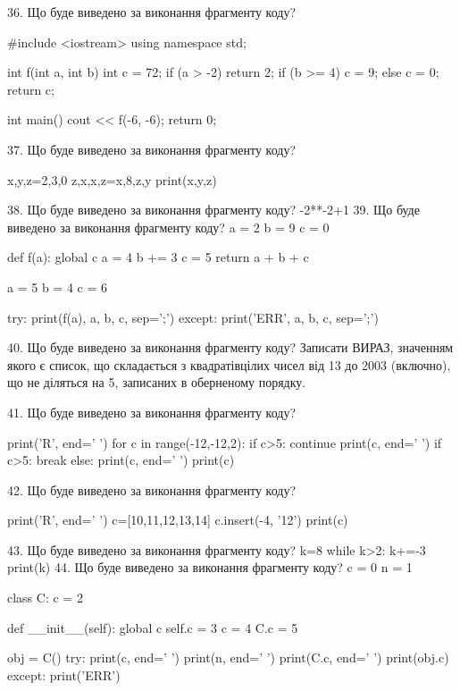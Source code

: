 \documentclass[11pt]{article}
\begin{document}
36. Що буде виведено за виконання фрагменту коду?

#include <iostream>
using namespace std;

int f(int a, int b){
    int c = 72;
    if (a > -2)
        return 2;
    if (b >= 4)
         c = 9;
    else 
        c = 0;
    return c;
}

int main(){
    cout << f(-6, -6);
    return 0;
}

37. Що буде виведено за виконання фрагменту коду?

x,y,z=2,3,0
z,x,x,z=x,8,z,y
print(x,y,z)

38. Що буде виведено за виконання фрагменту коду?
-2**-2+1
39. Що буде виведено за виконання фрагменту коду?
a = 2
b = 9
c = 0

def f(a):
global c    a = 4
    b += 3
    c = 5
    return a + b + c

a = 5
b = 4
c = 6

try:
    print(f(a), a, b, c, sep=';')
except:
    print('ERR', a, b, c, sep=';')

40. Що буде виведено за виконання фрагменту коду?
Записати ВИРАЗ, значенням якого є список, що складається з квадратівцілих чисел від 13 до 2003 (включно), що не діляться на 5, записаних в обернено\-му порядку.

41. Що буде виведено за виконання фрагменту коду?

print('R', end=' ')
for c in range(-12,-12,2):
    if c>5:
        continue
        print(c, end=' ')
    if c>5:
        break
    else:
        print(c, end=' ')
    print(c)

42. Що буде виведено за виконання фрагменту коду?

print('R', end=' ')
c=[10,11,12,13,14]
c.insert(-4, '12')
print(c)


43. Що буде виведено за виконання фрагменту коду?
k=8
   while k>2: k+=-3
   print(k)
44. Що буде виведено за виконання фрагменту коду?
c = 0
n = 1

class C:
    c = 2
    
    def __init__(self):
global c        self.c = 3
        c = 4
        C.c = 5

obj = C()
try:
    print(c, end=' ')
    print(n, end=' ')
    print(C.c, end=' ')
    print(obj.c)
except:
    print('ERR')
\end{document}
